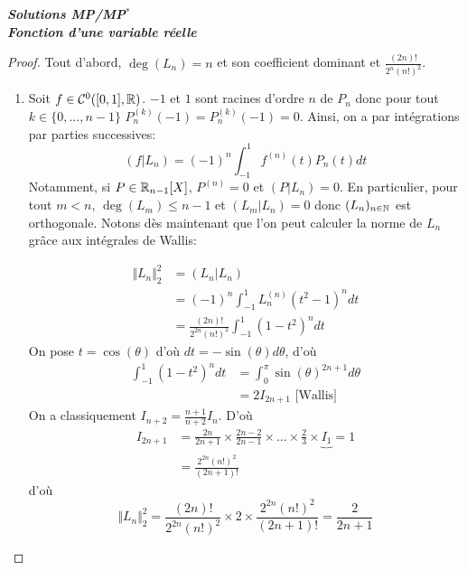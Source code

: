 \documentclass[12pt]{article}
\begin{document}
\begin{titlepage}
	\centering
	\vspace*{\fill}
	\Huge \textit{\textbf{Solutions MP/MP$^*$\\ Fonction d'une variable réelle}}
	\vspace*{\fill}
\end{titlepage}

\begin{proof}
	Tout d'abord, $\deg(L_{n})=n$ et  son coefficient dominant et $\frac{(2n)!}{2^{n}(n!)^{2}}$.
	\begin{enumerate}
		\item Soit $f\in\mathcal{C}^{0}([0,1],\mathbb{R})$. $-1$ et $1$ sont racines d'ordre $n$ de $P_{n}$ donc pour tout $k\in\{0,\dots,n-1\}$ $P_{n}^{(k)}(-1)=P_{n}^{(k)}(-1)=0$. Ainsi, on a par intégrations par parties successives:
		\begin{equation}(f|L_{n})=(-1)^{n}\int_{-1}^{1}f^{(n)}(t)P_{n}(t)dt\end{equation}
		Notamment, si $P\in\mathbb{R}_{n-1}[X]$, $P^{(n)}=0$ et $(P|L_{n})=0$. En particulier, pour tout $m<n$, $\deg(L_{m})\leqslant n-1$ et $(L_{m}|L_{n})=0$ donc $(L_{n})_{n\in\mathbb{N}}$ est orthogonale. Notons dès maintenant que l'on peut calculer la norme de $L_{n}$ grâce aux intégrales de Wallis:
		
		\begin{align}
			\Vert L_{n}\Vert_{2}^{2}
			&=(L_{n}|L_{n})\\
			&=(-1)^{n}\int_{-1}^{1}L_{n}^{(n)}(t^{2}-1)^{n}dt\\
			&=\frac{(2n)!}{2^{2n}(n!)^{2}}\int_{-1}^{1}(1-t^{2})^{n}dt
		\end{align}
		On pose $t=\cos(\theta)$ d'où $dt=-\sin(\theta)d\theta$, d'où
		\begin{align}
			\int_{-1}^{1}(1-t^{2})^{n}dt
			&=\int_{0}^{\pi}\sin(\theta)^{2n+1}d\theta\\
			&=2I_{2n+1}\text{ [Wallis] }
		\end{align}
		On a classiquement $I_{n+2}=\frac{n+1}{n+2}I_{n}$.
		D'où
		\begin{align}
			I_{2n+1}
			&=\frac{2n}{2n+1}\times\frac{2n-2}{2n-1}\times\dots\times\frac{2}{3}\times \underbrace{I_{1}}{=1}\\
			&=\frac{2^{2n}(n!)^{2}}{(2n+1)!}
		\end{align}
		d'où
		\begin{equation}\Vert L_{n}\Vert_{2}^{2}=\frac{(2n)!}{2^{2n}(n!)^{2}}\times 2\times \frac{2^{2n}(n!)^{2}}{(2n+1)!}=\frac{2}{2n+1}\end{equation}


\end{enumerate}
\end{proof}
\end{document}
